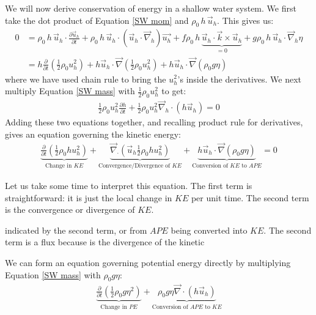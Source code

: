 We will now derive conservation of energy in a shallow water system. We first take the dot product of Equation \ref{SW mom} and \(\rho_0 \,h\,\vec{u}_h\). This gives us:
\begin{align*}
    0&=\rho_0 \,h\,\vec{u}_h\cdot\frac{\partial \vec{u}_h}{\partial t}+
    \rho_0 \,h\,\vec{u}_h\cdot \left( \vec{u}_h\cdot \vec{\nabla}_h \right)\vec{u_h}+
    f\rho_0 \,h\,\underbrace{\vec{u}_h\cdot \vec{k}\times\vec{u}_h}_{=0}+
    g\rho_0 \,h\,\vec{u}_h\cdot\vec{\nabla}_h\eta\\
    &=h\frac{\partial}{\partial t}\left( \frac{1}{2}\rho_0 u_h^2 \right)
    +h \vec{u}_h\cdot\vec{\nabla}\left( \frac{1}{2}\rho_0 u_h^2 \right)
    +h\vec{u}_h\cdot\vec{\nabla}\left( \rho_0 g \eta \right)
\end{align*}
where we have used chain rule to bring the \(u_h^2\)'s inside the derivatives. We next multiply Equation \ref{SW mass} with \(\frac{1}{2}\rho_0 u_h^2\) to get:
\begin{align*}
    \frac{1}{2}\rho_0 u_h^2\frac{\partial h}{\partial t}+\frac{1}{2}\rho_0 u_h^2 \vec{\nabla}_h\cdot\left( h\vec{u}_h \right)=0
\end{align*}
Adding these two equations together, and recalling product rule for derivatives, gives an equation governing the kinetic energy:
\begin{align*}
    \underbrace{\frac{\partial}{\partial t}\left( \frac{1}{2}\rho_0 h u_h^2 \right)}_{\text{Change in }KE}
    +\underbrace{\vec{\nabla}_\cdot\left( \vec{u}_h \frac{1}{2}\rho_0 h u_h^2 \right)}_{\text{Convergence/Divergence of }KE}
    +\underbrace{h\vec{u}_h \cdot\vec{\nabla}(\rho_0 g \eta)}_{\text{Conversion of }KE\text{ to }APE}=0
\end{align*}

Let us take some time to interpret this equation. The first term is straightforward: it is just the local change in \(KE\) per unit time. The second term is the convergence or divergence of \(KE\).

indicated by the second term, or from \(APE\) being converted into \(KE\). The second term is a flux because is the divergence of the kinetic 

We can form an equation governing potential energy directly by multiplying Equation \ref{SW mass} with \(\rho_0 g \eta\):
\begin{align*}
    \underbrace{\frac{\partial}{\partial t}\left( \frac{1}{2}\rho_0 g \eta^2\right)}_{\text{Change in }PE}
    +\underbrace{\rho_0 g \eta \vec{\nabla}\cdot \left( h\vec{u}_h \right)}_{\text{Conversion of }APE\text{ to }KE}
\end{align*}

